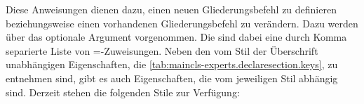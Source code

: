\begin{Declaration}
\end{Declaration}
Diese Anweisungen dienen dazu, einen neuen Gliederungsbefehl
 zu definieren beziehungsweise einen vorhandenen
Gliederungsbefehl  zu verändern. Dazu werden über das
optionale Argument  vorgenommen. Die
 sind dabei eine durch Komma separierte Liste von
=-Zuweisungen. Neben den vom Stil der Überschrift
unabhängigen Eigenschaften, die
\autoref{tab:maincls-experts.declaresection.keys},
 zu entnehmen sind, gibt
es auch Eigenschaften, die vom jeweiligen Stil abhängig sind. Derzeit stehen
die folgenden Stile zur Verfügung:

